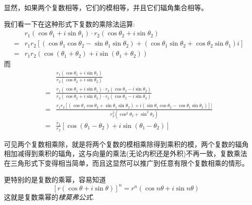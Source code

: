 显然，如果两个复数相等，它们的模相等，并且它们辐角集合相等。

我们看一下在这种形式下复数的乘除法运算:
\begin{eqnarray*}
  &&  r_1(\cos{\theta_1}+i\sin{\theta_1}) \cdot r_2(\cos{\theta_2}+i\sin{\theta_2}) \\
  & = & r_1r_2[(\cos{\theta_1}\cos{\theta_2}-\sin{\theta_1}\sin{\theta_2})+(\cos{\theta_1}\sin{\theta_2}+\cos{\theta_2}\sin{\theta_1})i] \\
  & = & r_1r_2(\cos{(\theta_1+\theta_2)}+i\sin{(\theta_1+\theta_2)})
\end{eqnarray*}
而
\begin{eqnarray*}
  &&  \frac{r_1(\cos{\theta_1}+i\sin{\theta_1})}{r_2(\cos{\theta_2}+i\sin{\theta_2})} \\
  & = & \frac{r_1(\cos{\theta_1}+i\sin{\theta_1}) \cdot r_2(\cos{\theta_2}-i\sin{\theta_2})}{r_2(\cos{\theta_2}+i\sin{\theta_2}) \cdot r_2(\cos{\theta_2}-i\sin{\theta_2})} \\
  & = & \frac{r_1r_2[(\cos{\theta_1}\cos{\theta_2}+\sin{\theta_1}\sin{\theta_2})+i(\sin{\theta_1}\cos{\theta_2}-\cos{\theta_1}\sin{\theta_2})]]}{r_2^2(\cos^2{\theta_2}+\sin^2{\theta_2})} \\
  & = & \frac{r_1}{r_2}[\cos{(\theta_1-\theta_2)+i\sin{(\theta_1-\theta_2)}}]
\end{eqnarray*}

可见两个复数相乘除，就是将两个复数的模相乘除得到乘积的模，两个复数的辐角相加减得到乘积的辐角，这与向量的乘法(无论内积还是外积)不再一致，复数乘法在三角形式下变得相当简单，而且这显然可以推广到任意有限个复数相乘的情形。

更特别的是复数的乘幂，容易知道
\begin{equation}
  \label{eq:de-moivre-formula}
  [r(\cos{\theta}+i\sin{\theta})]^n = r^n(\cos{n\theta}+i\sin{n\theta})
\end{equation}
这就是复数乘幂的\emph{棣莫弗公式}.

